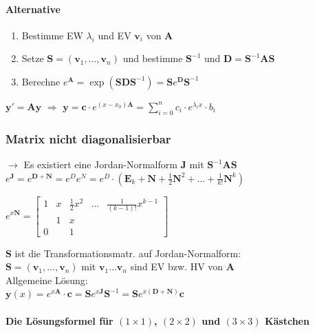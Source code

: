 \documentclass[6pt,a4paper]{scrartcl}
\newcommand{\mat}[1]{\ensuremath{\begin{bmatrix} #1 \end{bmatrix}}}								%
\newcommand{\ma}[1]{\ensuremath{\boldsymbol {#1}}}												%
\renewcommand{\vec}[1]{\ensuremath{\boldsymbol {#1}}}											%
\newcommand{\Ra}[0]{\ensuremath{\Rightarrow}}									%
\newcommand{\ra}[0]{\ensuremath{\rightarrow}} 									%
\begin{document}
\begin{multicols*}{4}
\paragraph{Alternative}
\begin{enumerate}
	\item Bestimme EW $\lambda_i$ und EV $\vec v_i$ von $\ma A$
	\item Setze $\ma S = (\vec v_1, ..., \vec v_n)$ und bestimme $\ma S^{-1}$ und $\ma D = \ma S^{-1} \ma A \ma S$
	\item Berechne $e^{\ma A} = \exp(\ma S \ma D \ma S^{-1}) = \ma S e^{\ma D} \ma S^{-1} $
\end{enumerate}
$\vec y' = \ma A \vec y$ \quad $\Ra$ \quad $\vec y = \vec c \cdot e^{(x-x_0)\ma A} = \sum\limits_{i = 0}^n c_i \cdot e^{\lambda_i x} \cdot b_i$\\

\iffalse
\subsubsection{Matrix nicht diagonalisierbar}
$\ra$	Es existiert eine Jordan-Normalform $\ma J$ mit $\ma S^{-1} \ma A \ma S$\\


$e^{\ma J} = e^{\ma D + \ma N} = e^{D} e^{N} = e^D \cdot (\ma E_k + \ma N + \frac{1}{2} \ma N^2 + ... + \frac{1}{k!} \ma N^k)$

$e^{x\ma N} =  \mat{1 & x & \frac{1}{2} x^2 & ... & \frac{1}{(k-1)!} x^{k-1} \\ & 1 & x & & \\ 0 & & 1 & }$

$\ma S$ ist die Transformationsmatr. auf Jordan-Normalform: \\
$\ma S = (\vec v_1, ..., \vec v_n)$ mit $\vec v_1 \ldots \vec v_n$ sind EV bzw. HV von $\ma A$
\\


Allgemeine Lösung: \\
$\boxed{\vec y(x) = e^{x \ma A} \cdot \vec c = \ma S e^{x \ma J} \ma S^{-1} = \ma S e^{x(\ma D + \ma N)} \vec c}$

\paragraph{Die Lösungsformel für $(1 \times 1)$, $(2 \times 2)$ und $(3 \times 3)$ Kästchen}


\end{multicols*}
\end{document}
